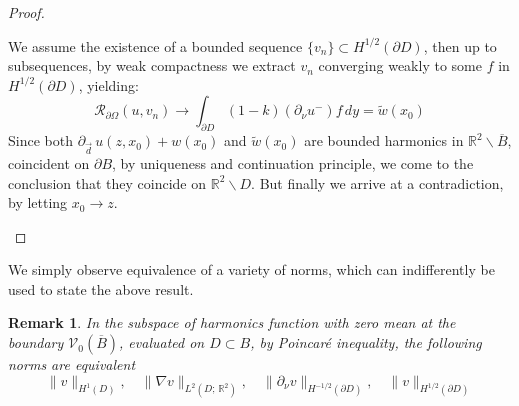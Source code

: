 \documentclass[10pt, a4paper, twoside, openright]{book}
\theoremstyle{definition}
\theoremstyle{plain}
\theoremstyle{plain}
\theoremstyle{plain}
\theoremstyle{plain}
\newtheorem{remark}[subsection]{Remark}
\theoremstyle{plain}
\theoremstyle{plain}
\theoremstyle{plain}
\theoremstyle{plain}
\begin{document}
\begin{proof}
\begin{enumerate}
\begin{equation}
  \end{equation}
  We assume the existence of a bounded sequence $\{v_n\} \subset H^{1/2}(\partial D)$, then up to subsequences, by weak compactness we extract $v_n$ converging weakly to some $f$ in $H^{1/2}(\partial D)$, yielding:
  \begin{equation}
   \mathcal{R}_{\partial \Omega}(u,v_n) \to \int_{\partial D}(1-k)(\partial_\nu u^- )f\,dy = \widetilde{w}(x_0)
  \end{equation}
 Since both $\partial_{\vec{d}}\,u(z,x_0) + w(x_0)$ and $\widetilde{w}(x_0)$ are bounded harmonics in $\mathbb{R}^2\backslash\overline{B}$, coincident on $\partial B$, by uniqueness and continuation principle, we come to the conclusion that they coincide on $\mathbb{R}^2\backslash D$. But finally we arrive at a contradiction, by letting $x_0\to z$.
 \end{enumerate}
\end{proof}
We simply observe equivalence of a variety of norms, which can indifferently be used to state the above result.
\begin{remark}
 In the subspace of harmonics function with zero mean at the boundary $\mathcal{V}_0(\overline{B})$, evaluated on $D\subset B$, by Poincaré inequality, the following norms are equivalent
 \begin{equation}
  \|v\|_{H^1(D)},\quad\|\nabla v\|_{L^2(D;\,\mathbb{R}^2)},\quad \|\partial_\nu v\|_{H^{-1/2}(\partial D)},\quad \|v\|_{H^{1/2}(\partial D)}
 \end{equation}
\end{remark}
\end{document}

